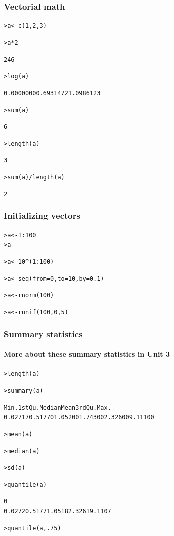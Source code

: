 \documentclass[t]{beamer} %
\begin{document}
\begin{frame}[fragile]
  \frametitle{Vectorial math}

\ungap[1]
\begin{alltt}
> a <- c(1,2,3) 

> a * 2   \begin{Rout}
[1] 2 4 6
\end{Rout}

> log(a)  \begin{Rout}
[1] 0.0000000 0.6931472 1.0986123
\end{Rout}
> sum(a)  \begin{Rout}
[1] 6
\end{Rout}
> length(a)\begin{Rout}
[1] 3
\end{Rout}
> sum(a)/length(a)\begin{Rout}
[1] 2
\end{Rout}
\end{alltt}

\end{frame}


\begin{frame}[fragile]
  \frametitle{Initializing vectors}

\begin{alltt}
> a <- 1:100            
> a

> a <- 10^(1:100)

> a <- seq(from=0, to=10, by=0.1) 

> a <- rnorm(100)       

> a <- runif(100, 0, 5) 
\end{alltt}
\end{frame}

\begin{frame}[fragile]
  \frametitle{Summary statistics}
  \framesubtitle{More about these summary statistics in Unit 3}

\begin{alltt}
> length(a)

> summary(a)   \begin{Rout}
   Min. 1st Qu.  Median    Mean 3rd Qu.    Max. 
0.02717 0.51770 1.05200 1.74300 2.32600 9.11100  \end{Rout}

> mean(a)

> median(a)

> sd(a)       

> quantile(a) \begin{Rout}
    0%
0.0272 0.5177 1.0518 2.3261 9.1107 \end{Rout}

> quantile(a,.75)
\end{alltt}

\end{frame}
\end{document}
